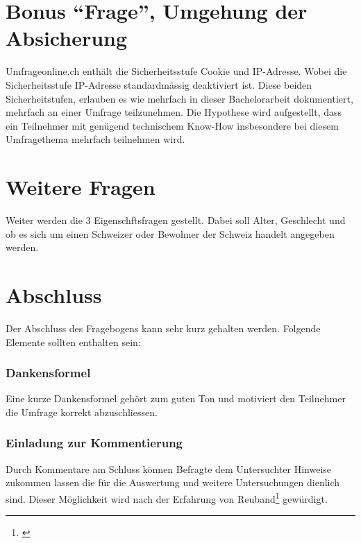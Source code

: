 \section{\texorpdfstring{Bonus ``Frage'', Umgehung der
Absicherung}{Bonus Frage, Umgehung der Absicherung}}\label{bonus-frage-umgehung-der-absicherung}

Umfrageonline.ch enthält die Sicherheitsstufe Cookie und IP-Adresse.
Wobei die Sicherheitsstufe IP-Adresse standardmässig deaktiviert ist.
Diese beiden Sicherheitstufen, erlauben es wie mehrfach in dieser
Bachelorarbeit dokumentiert, mehrfach an einer Umfrage teilzunehmen. Die
Hypothese wird aufgestellt, dass ein Teilnehmer mit genügend technischem
Know-How insbesondere bei diesem Umfragethema mehrfach teilnehmen wird.

\section{Weitere Fragen}\label{weitere-fragen}

Weiter werden die 3 Eigenschftsfragen gestellt. Dabei soll Alter,
Geschlecht und ob es sich um einen Schweizer oder Bewohner der Schweiz
handelt angegeben werden.

\section{Abschluss}\label{abschluss}

Der Abschluss des Fragebogens kann sehr kurz gehalten werden. Folgende
Elemente sollten enthalten sein:

\subsubsection{Dankensformel}\label{dankensformel}

Eine kurze Dankensformel gehört zum guten Ton und motiviert den
Teilnehmer die Umfrage korrekt abzuschliessen.

\subsubsection{Einladung zur
Kommentierung}\label{einladung-zur-kommentierung}

Durch Kommentare am Schluss können Befragte dem Untersuchter Hinweise
zukommen lassen die für die Auswertung und weitere Untersuchungen
dienlich sind. Dieser Möglichkeit wird nach der Erfahrung von
Reuband\footnote{\autocite{kzfss01}} gewürdigt.

